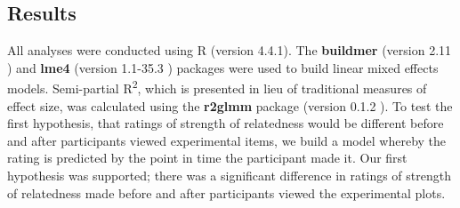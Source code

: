 \documentclass[manuscript,screen,review]{acmart}
\begin{document}
\subsection{Results}\label{results}

All analyses were conducted using R (version 4.4.1). The
\textbf{buildmer} (version 2.11 \citep{buildmer}) and \textbf{lme4}
(version 1.1-35.3 \citep{lme4}) packages were used to build linear mixed
effects models. Semi-partial R\textsuperscript{2}, which is presented in
lieu of traditional measures of effect size, was calculated using the
\textbf{r2glmm} package (version 0.1.2 \citep{r2glmm}). To test the
first hypothesis, that ratings of strength of relatedness would be
different before and after participants viewed experimental items, we
build a model whereby the rating is predicted by the point in time the
participant made it. Our first hypothesis was supported; there was a
significant difference in ratings of strength of relatedness made before
and after participants viewed the experimental plots.

\begin{table}

\caption{\label{tbl-abso-diff}Statistics for the significant main effect
of rating time. Semi-partial R\textsuperscript{2} is also incuded.}


\end{table}%
\end{document}
